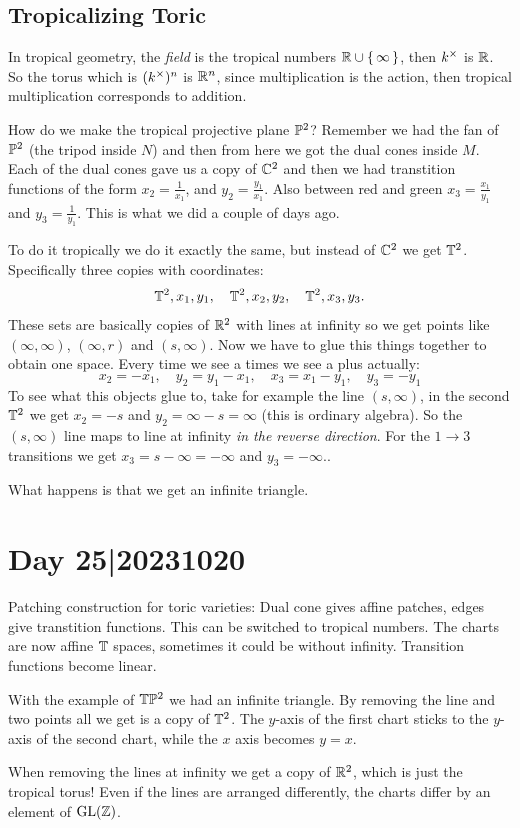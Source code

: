 \documentclass[12pt]{memoir}
\begin{document}
\subsection{Tropicalizing Toric}

In tropical geometry, the \emph{field} is the tropical numbers $\mathbb{R}\cup\{\,\infty\,\}$, then $k^\times$ is $\mathbb{R}$. So the torus which is $(k^\times)^n$ is $\mathbb{R}^n$, since multiplication is the action, then tropical multiplication corresponds to addition. 

\begin{Ex}
    How do we make the tropical projective plane $\mathbb{P}^2$? Remember we had the fan of $\mathbb{P}^2$ (the tripod inside $N$) and then from here we got the dual cones inside $M$. Each of the dual cones gave us a copy of $\mathbb{C}^2$ and then we had transtition functions of the form $x_2=\frac{1}{x_1}$, and $y_2=\frac{y_1}{x_1}$. Also between red and green $x_3=\frac{x_1}{y_1}$ and $y_3=\frac{1}{y_1}$. This is what we did a couple of days ago.\par 
    To do it tropically we do it exactly the same, but instead of $\mathbb{C}^2$ we get $\mathbb{T}^2$. Specifically three copies with coordinates:
    $$\mathbb{T}^2,x_1,y_1,\quad\mathbb{T}^2,x_2,y_2,\quad\mathbb{T}^2,x_3,y_3.$$ 
    These sets are basically copies of $\mathbb{R}^2$ with lines at infinity so we get points like $(\infty,\infty)$, $(\infty,r)$ and $(s,\infty)$. Now we have to glue this things together to obtain one space. Every time we see a times we see a plus actually:
    $$x_2=-x_1,\quad y_2=y_1-x_1,\quad x_3=x_1-y_1,\quad y_3=-y_1$$
    To see what this objects glue to, take for example the line $(s,\infty)$, in the second $\mathbb{T}^2$ we get $x_2=-s$ and $y_2=\infty-s=\infty$ (this is ordinary algebra). So the $(s,\infty)$ line maps to line at infinity \emph{in the reverse direction}. For the $1\to3$ transitions we get $x_3=s-\infty=-\infty$ and $y_3=-\infty$..\par 
    What happens is that we get an infinite triangle.
\end{Ex}

\section{Day 25|20231020}

Patching construction for toric varieties: Dual cone gives affine patches, edges give transtition functions. This can be switched to tropical numbers. The charts are now affine $\mathbb{T}$ spaces, sometimes it could be without infinity. Transition functions become linear.\par 
With the example of $\mathbb{T}\mathbb{P}^2$ we had an infinite triangle. By removing the line and two points all we get is a copy of $\mathbb{T}^2$. The $y$-axis of the first chart sticks to the $y$-axis of the second chart, while the $x$ axis becomes $y=x$. 
\begin{Rmk}
When removing the lines at infinity we get a copy of $\mathbb{R}^2$, which is just the tropical torus! Even if the lines are arranged differently, the charts differ by an element of $\operatorname{GL}(\mathbb{Z})$. 
\end{Rmk}
\end{document}
